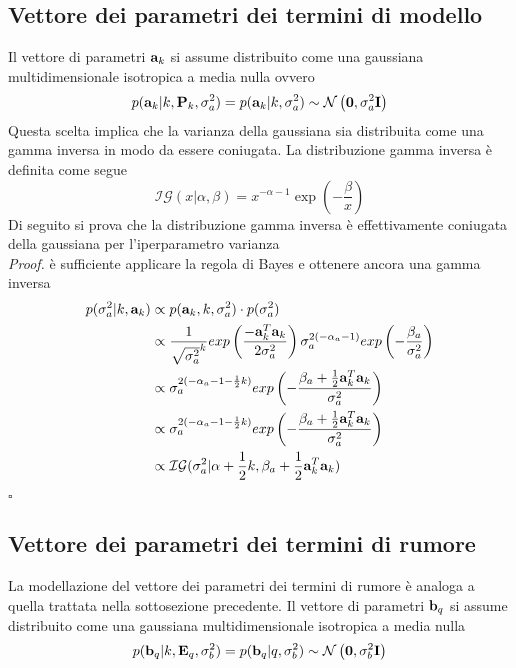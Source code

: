 \subsection*{Vettore dei parametri dei termini di modello}
Il vettore di parametri $\textbf{a}_k$ si assume distribuito come una gaussiana multidimensionale isotropica a media nulla ovvero
\begin{equation}
p(\textbf{a}_k|k, \textbf{P}_k , \sigma_a^2 ) = p(\textbf{a}_k |k, \sigma_a^2 ) \sim \mathcal{N}\left(\textbf{0},\sigma_a^2\textbf{I}\right)
\end{equation}
Questa scelta implica che la varianza della gaussiana sia distribuita come una gamma
inversa in modo da essere coniugata. La distribuzione gamma inversa è definita come
segue
\begin{equation}
\mathcal{I}\mathcal{G}(x|\alpha,\beta)= x^{-\alpha-1}\exp\left(-\frac{\beta}{x}\right)
\end{equation}
Di seguito si prova che la distribuzione gamma inversa è effettivamente coniugata
della gaussiana per l’iperparametro varianza\\
\textit{Proof.} è sufficiente applicare la regola di Bayes e ottenere ancora una gamma inversa
\begin{align*}
p(\sigma_a^2|k,\textbf{a}_k) & \propto p(\textbf{a}_k,k,\sigma_a^2)\cdot p(\sigma_a^2)\\
			 &\propto   \frac{1}{\sqrt{\sigma_a^2}^k}exp\left(\frac{-\textbf{a}_k^T\textbf{a}_k}{2\sigma_a^2}\right)\sigma_a^{2(-\alpha_a-1)}exp\left(-\frac{\beta_a}{\sigma_a^2}\right)\\
			 &\propto  \sigma_a^{2(-\alpha_a-1-\frac{1}{2}k)}exp\left(-\frac{\beta_a+\frac{1}{2}\textbf{a}_k^T\textbf{a}_k}{\sigma_a^2}\right) \\ 
			 &\propto   \sigma_a^{2(-\alpha_a-1-\frac{1}{2}k)}exp\left(-\frac{\beta_a+\frac{1}{2}\textbf{a}_k^T\textbf{a}_k}{\sigma_a^2}\right) \\
			 &\propto \mathcal{I}\mathcal{G}(\sigma_a^2|\alpha+\frac{1}{2}k,\beta_a+\frac{1}{2}\textbf{a}_k^T\textbf{a}_k)	
\end{align*}
 \begin{flushright}
 $\square$
 \end{flushright}

 \subsection*{Vettore dei parametri dei termini di rumore}
 La modellazione del vettore dei parametri dei termini di rumore è analoga a quella
trattata nella sottosezione precedente. Il vettore di parametri $\textbf{b}_q$ si assume distribuito come una gaussiana multidimensionale isotropica a media nulla
\begin{equation}
p(\textbf{b}_q |k, \textbf{E}_q , \sigma_b^2 ) = p(\textbf{b}_q |q, \sigma_b^2 ) \sim \mathcal{N}\left(\textbf{0},\sigma_b^2\textbf{I}\right)
\end{equation}


